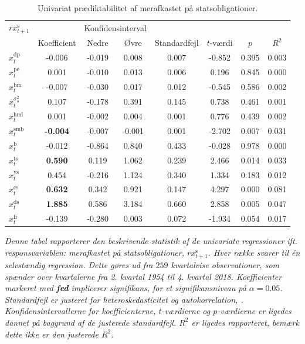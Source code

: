 \documentclass[
  a4paper,
  oneside]{memoir}
\begin{document}
\begin{table}[H]

\caption{\label{tab:UNI-s}Univariat prædiktabilitet af merafkastet på statsobligationer.}
\centering
\begin{threeparttable}
\begin{tabular}[t]{lccccccc}
\toprule
\multicolumn{1}{c}{$rx_{t+1}^{\text{s}}$} & \multicolumn{1}{c}{ } & \multicolumn{2}{c}{Konfidensinterval} & \multicolumn{4}{c}{ } \\
\cmidrule(l{3pt}r{3pt}){1-1} \cmidrule(l{3pt}r{3pt}){3-4}
  & Koefficient & Nedre & Øvre & Standardfejl & $t$-værdi & $p$ & $R^2$\\
\midrule
\rowcolor{gray!6}  $x_t^{\text{dp}}$ & -0.006 & -0.019 & 0.008 & 0.007 & -0.852 & 0.395 & 0.003\\
$x_t^{\text{pe}}$ & 0.001 & -0.010 & 0.013 & 0.006 & 0.196 & 0.845 & 0.000\\
\rowcolor{gray!6}  $x_t^{\text{bm}}$ & -0.007 & -0.030 & 0.017 & 0.012 & -0.545 & 0.586 & 0.002\\
$x_t^{\sigma_{\text{a}}^2}$ & 0.107 & -0.178 & 0.391 & 0.145 & 0.738 & 0.461 & 0.001\\
\rowcolor{gray!6}  $x_t^{\text{hml}}$ & 0.001 & -0.002 & 0.004 & 0.001 & 0.776 & 0.439 & 0.002\\
$x_t^{\text{smb}}$ & \textbf{-0.004} & -0.007 & -0.001 & 0.001 & -2.702 & 0.007 & 0.031\\
\rowcolor{gray!6}  $x_t^{\text{b}}$ & -0.012 & -0.864 & 0.840 & 0.433 & -0.028 & 0.978 & 0.000\\
$x_t^{\text{ts}}$ & \textbf{ 0.590} & 0.119 & 1.062 & 0.239 & 2.466 & 0.014 & 0.033\\
\rowcolor{gray!6}  $x_t^{\text{ys}}$ & 0.454 & -0.216 & 1.124 & 0.340 & 1.334 & 0.183 & 0.012\\
$x_t^{\text{cs}}$ & \textbf{ 0.632} & 0.342 & 0.921 & 0.147 & 4.297 & 0.000 & 0.081\\
\rowcolor{gray!6}  $x_t^{\text{ds}}$ & \textbf{ 1.885} & 0.586 & 3.184 & 0.660 & 2.858 & 0.005 & 0.047\\
$x_t^{\text{fr}}$ & -0.139 & -0.280 & 0.003 & 0.072 & -1.934 & 0.054 & 0.017\\
\bottomrule
\end{tabular}
\begin{tablenotes}
\item \textit{Denne tabel rapporterer den beskrivende statistik af de univariate regressioner ift. responsvariablen: merafkastet på statsobligationer, $rx_{t+1}^{\text{s}}$. Hver række svarer til én selvstændig regression. Dette gøres ud fra $259$ kvartalvise observationer, som spænder over kvartalerne fra 2. kvartal 1954 til 4. kvartal 2018. Koefficienter markeret med \textbf{fed} implicerer signifikans, for et signifikansniveau på $\alpha=0.05$. Standardfejl er justeret for heteroskedasticitet og autokorrelation, \citep{Newey1987}. Konfidensintervallerne for koefficienterne, $t$-værdierne og $p$-værdierne er ligedes dannet på baggrund af de justerede standardfejl. $R^2$ er ligedes rapporteret, bemærk dette ikke er den justerede $R^2$.}
\end{tablenotes}
\end{threeparttable}
\end{table}
\end{document}
